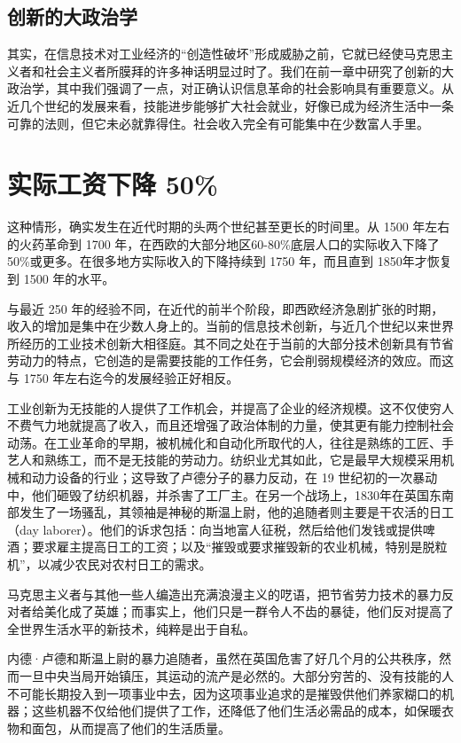 \subsection{创新的大政治学}
其实，在信息技术对工业经济的“创造性破坏”形成威胁之前，它就已经使马克思主义者和社会主义者所膜拜的许多神话明显过时了。我们在前一章中研究了创新的大政治学，其中我们强调了一点，对正确认识信息革命的社会影响具有重要意义。从近几个世纪的发展来看，技能进步能够扩大社会就业，好像已成为经济生活中一条可靠的法则，但它未必就靠得住。社会收入完全有可能集中在少数富人手里。

\section{实际工资下降 50\%}
这种情形，确实发生在近代时期的头两个世纪甚至更长的时间里。从 1500 年左右的火药革命到 1700 年，在西欧的大部分地区60-80\%底层人口的实际收入下降了 50\%或更多。在很多地方实际收入的下降持续到 1750 年，而且直到 1850年才恢复到 1500 年的水平。

与最近 250 年的经验不同，在近代的前半个阶段，即西欧经济急剧扩张的时期，收入的增加是集中在少数人身上的。当前的信息技术创新，与近几个世纪以来世界所经历的工业技术创新大相径庭。其不同之处在于当前的大部分技术创新具有节省劳动力的特点，它创造的是需要技能的工作任务，它会削弱规模经济的效应。而这与 1750 年左右迄今的发展经验正好相反。

工业创新为无技能的人提供了工作机会，并提高了企业的经济规模。这不仅使穷人不费气力地就提高了收入，而且还增强了政治体制的力量，使其更有能力控制社会动荡。在工业革命的早期，被机械化和自动化所取代的人，往往是熟练的工匠、手艺人和熟练工，而不是无技能的劳动力。纺织业尤其如此，它是最早大规模采用机械和动力设备的行业；这导致了卢德分子的暴力反动，在 19 世纪初的一次暴动中，他们砸毁了纺织机器，并杀害了工厂主。在另一个战场上，1830年在英国东南部发生了一场骚乱，其领袖是神秘的斯温上尉，他的追随者则主要是干农活的日工（day laborer）。他们的诉求包括：向当地富人征税，然后给他们发钱或提供啤酒；要求雇主提高日工的工资；以及“摧毁或要求摧毁新的农业机械，特别是脱粒机”，以减少农民对农村日工的需求。

马克思主义者与其他一些人编造出充满浪漫主义的呓语，把节省劳力技术的暴力反对者给美化成了英雄；而事实上，他们只是一群令人不齿的暴徒，他们反对提高了全世界生活水平的新技术，纯粹是出于自私。

内德·卢德和斯温上尉的暴力追随者，虽然在英国危害了好几个月的公共秩序，然而一旦中央当局开始镇压，其运动的流产是必然的。大部分穷苦的、没有技能的人不可能长期投入到一项事业中去，因为这项事业追求的是摧毁供他们养家糊口的机器；这些机器不仅给他们提供了工作，还降低了他们生活必需品的成本，如保暖衣物和面包，从而提高了他们的生活质量。

